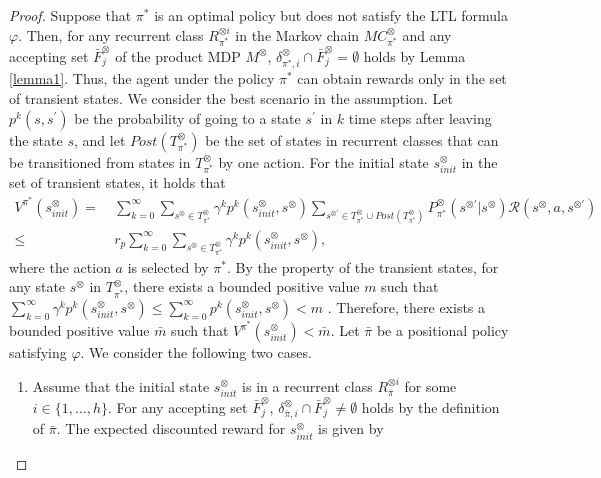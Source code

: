 \documentclass[a4j,12pt,oneside,openany,english]{jsbook}
\begin{document}
\begin{proof}
  Suppose that $\pi^{\ast}$ is an optimal policy but does not satisfy the LTL formula $\varphi$. Then, for any recurrent class $R^{\otimes i}_{{\pi}^{\ast}}$ in the Markov chain $MC^{\otimes}_{{\pi}^{\ast}}$ and any accepting set $\bar{F}^{\otimes}_j$ of the product MDP $M^{\otimes}$,  $\delta^{\otimes}_{\pi^{\ast},i} \cap \bar{F}^{\otimes}_j = \emptyset$
  holds by Lemma \ref{lemma1}. Thus, the agent under the policy $\pi^{\ast}$ can obtain rewards only in the set of transient states. We consider the best scenario in the assumption. Let $p^k(s,s^{\prime})$ be the probability of going to a state $s^{\prime}$ in $k$ time steps after leaving the state $s$, and let $Post(T^{\otimes}_{\pi^{\ast}})$ be the set of states in recurrent classes that can be transitioned from states in $T^{\otimes}_{\pi^{\ast}}$ by one action. For the initial state $s^{\otimes}_{init}$ in the set of transient states, it holds that
  \begin{align}
    V^{\pi^{\ast}}\!(s^{\otimes}_{init})
     =\ & \sum_{k=0}^{\infty} \sum_{s^{\otimes} \in T^{\otimes}_{\pi^{\ast}}} \gamma^k p^k(s^{\otimes}_{init}, s^{\otimes}) \sum_{s^{\otimes \prime} \in T^{\otimes}_{\pi^{\ast}} \cup Post(T^{\otimes}_{\pi^{\ast}})} \!\!\!\!P^{\otimes}_{\pi^{\ast}}(s^{\otimes \prime}| s^{\otimes}) \mathcal{R}(s^{\otimes}, a, s^{\otimes \prime})\nonumber \\
     \leq\ & r_p \sum_{k=0}^{\infty} \sum_{s^{\otimes} \in T^{\otimes}_{\pi^{\ast}}} \gamma^k p^k(s^{\otimes}_{init}, s^{\otimes}), \nonumber
  \label{eqth11}
  \end{align}
  where the action $a$ is selected by $\pi^{\ast}$. By the property of the transient states, for any state $s^{\otimes}$ in $T^{\otimes}_{\pi^{\ast}}$, there exists a bounded positive value $m$ such that $ \sum_{k=0}^{\infty} \gamma^k p^k(s^{\otimes}_{init}, s^{\otimes}) \leq \sum_{k=0}^{\infty} p^k(s^{\otimes}_{init}, s^{\otimes}) < m$ \cite{ESS}. Therefore, there exists a bounded positive value $\bar{m}$ such that $V^{\pi^{\ast}}(s^{\otimes}_{init}) < \bar{m}$.
  Let $\bar{\pi}$ be a positional policy satisfying $\varphi$. We consider the following two cases.
  \begin{enumerate}
    \vspace{2mm}
    \item Assume that the initial state $s^{\otimes}_{init}$ is in a recurrent class $R^{\otimes i}_{\bar{\pi}}$ for some $ i \in \{1,\ldots,h\} $.
    For any accepting set $\bar{F}^{\otimes}_j$, $\delta^{\otimes}_{\bar{\pi},i} \cap \bar{F}^{\otimes}_j \neq \emptyset$ holds by the definition of $\bar{\pi}$. The expected discounted reward for $s^{\otimes}_{init}$ is given by

\end{enumerate}
\end{proof}
\end{document}
